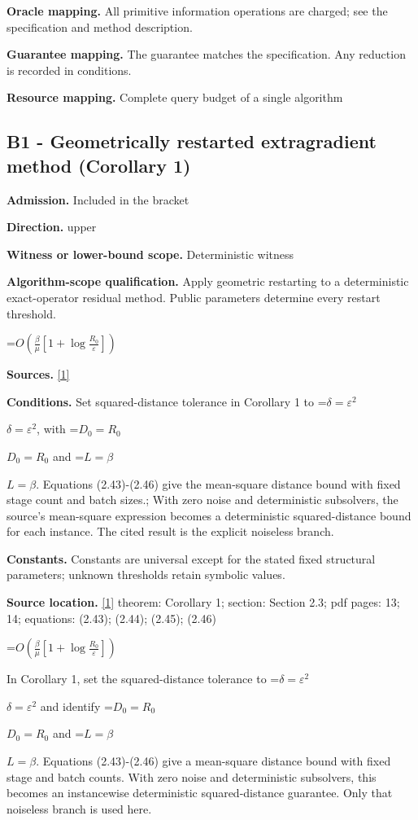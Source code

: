 \documentclass[10pt,a4paper]{article}
\newcommand{\AtlasMath}[1]{\par\begingroup\centering\setbox0=\hbox{$\displaystyle #1$}\ifdim\wd0>1.4\linewidth\typeout{ATLAS WIDE FORMULA: \the\wd0}\fi\ifdim\wd0>\linewidth\resizebox{\linewidth}{!}{\box0}\else\box0\fi\par\endgroup}
\newcommand{\AtlasInlineMath}[1]{\begingroup\setbox0=\hbox{$#1$}\ifdim\wd0>.4\linewidth\endgroup\AtlasMath{#1}\else\endgroup$#1$\fi}
\begin{document}
\textbf{Oracle mapping.} All primitive information operations are charged; see the specification and method description.

\textbf{Guarantee mapping.} The guarantee matches the specification. Any reduction is recorded in conditions.

\textbf{Resource mapping.} Complete query budget of a single algorithm

\subsection{B1 - Geometrically restarted extragradient method (Corollary 1)}
\textbf{Admission.} Included in the bracket

\textbf{Direction.} upper

\textbf{Witness or lower-bound scope.} Deterministic witness

\textbf{Algorithm-scope qualification.} Apply geometric restarting to a deterministic exact-operator residual method. Public parameters determine every restart threshold.

\AtlasMath{O\!\left(\frac{\beta}{\mu}\left[1+\log\frac{R_0}{\varepsilon}\right]\right)}
\textbf{Sources.} \href{https://arxiv.org/pdf/2609.04188v2}{[1]}

\textbf{Conditions.} Set squared-distance tolerance in Corollary 1 to \AtlasInlineMath{\delta=\varepsilon^2}, with \AtlasInlineMath{D_0=R_0} and \AtlasInlineMath{L=\beta}. Equations (2.43)-(2.46) give the mean-square distance bound with fixed stage count and batch sizes.; With zero noise and deterministic subsolvers, the source's mean-square expression becomes a deterministic squared-distance bound for each instance. The cited result is the explicit noiseless branch.

\textbf{Constants.} Constants are universal except for the stated fixed structural parameters; unknown thresholds retain symbolic values.

\textbf{Source location.} \href{https://arxiv.org/pdf/2609.04188v2}{[1]} theorem: Corollary 1; section: Section 2.3; pdf pages: 13; 14; equations: (2.43); (2.44); (2.45); (2.46)

\AtlasMath{O\!\left(\frac{\beta}{\mu}\left[1+\log\frac{R_0}{\varepsilon}\right]\right)}
In Corollary 1, set the squared-distance tolerance to \AtlasInlineMath{\delta=\varepsilon^2} and identify \AtlasInlineMath{D_0=R_0} and \AtlasInlineMath{L=\beta}. Equations (2.43)-(2.46) give a mean-square distance bound with fixed stage and batch counts. With zero noise and deterministic subsolvers, this becomes an instancewise deterministic squared-distance guarantee. Only that noiseless branch is used here.
\end{document}
